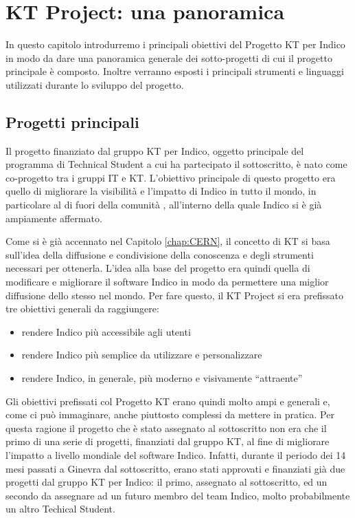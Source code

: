 \chapter{KT Project: una panoramica} \label{chap:panoramica}

	In questo capitolo introdurremo i principali obiettivi del Progetto KT per Indico in modo da dare una panoramica generale dei sotto-progetti di cui il progetto principale è composto. Inoltre verranno esposti i principali strumenti e linguaggi utilizzati durante lo sviluppo del progetto.
	
	\section{Progetti principali} \label{sec:p;progetti_principali}
    	
    	Il progetto finanziato dal gruppo \ac{KT} per Indico, oggetto principale del programma di Technical Student a cui ha partecipato il sottoscritto, è nato come co-progetto tra i gruppi \ac{IT} e \ac{KT}. L'obiettivo principale di questo progetto era quello di migliorare la visibilità e l'impatto di Indico in tutto il mondo, in particolare al di fuori della comunità , all'interno della quale Indico si è già ampiamente affermato.
    	
    	Come si è già accennato nel Capitolo \ref{chap:CERN}, il concetto di \ac{KT} si basa sull'idea della diffusione e condivisione della conoscenza e degli strumenti necessari per ottenerla. L'idea alla base del progetto era quindi quella di modificare e migliorare il software Indico in modo da permettere una miglior diffusione dello stesso nel mondo. Per fare questo, il KT Project si era prefissato tre obiettivi generali da raggiungere:
    	
    	\begin{itemize}
        	\item rendere Indico più accessibile agli utenti
        	\item rendere Indico più semplice da utilizzare e personalizzare
        	\item rendere Indico, in generale, più moderno e visivamente ``attraente''
    	\end{itemize}
    	
    	Gli obiettivi prefissati col Progetto KT erano quindi molto ampi e generali e, come ci può immaginare, anche piuttosto complessi da mettere in pratica. Per questa ragione il progetto che è stato assegnato al sottoscritto non era che il primo di una serie di progetti, finanziati dal gruppo \ac{KT}, al fine di migliorare l'impatto a livello mondiale del software Indico. Infatti, durante il periodo dei 14 mesi passati a Ginevra dal sottoscritto, erano stati approvati e finanziati già due progetti dal gruppo \ac{KT} per Indico: il primo, assegnato al sottoscritto, ed un secondo da assegnare ad un futuro membro del team Indico, molto probabilmente un altro Techical Student.
    	
